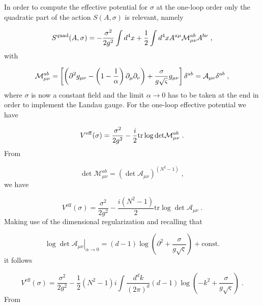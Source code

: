 \documentclass[a4paper,12pt]{article}
\begin{document}
In order to compute the effective potential for $\sigma $ at the one-loop
order only the quadratic part of the action $S(A,\sigma )$ is relevant,
namely

\begin{equation}
S^{\mathrm{quad}}(A,\sigma )=-\frac{\sigma ^{2}}{2g^{2}}\int d^{4}x+\frac{1}{%
2}\int d^{4}xA^{a\mu }\mathcal{M}_{\mu \nu }^{ab}A^{b\nu }\;,  \label{sq}
\end{equation}
with

\begin{equation}
\mathcal{M}_{\mu \nu }^{ab}=\left[ \left( \partial ^{2}g_{\mu \nu }-\left( 1-%
\frac{1}{\alpha }\right) \partial _{\mu }\partial _{\nu }\right) +\frac{%
\sigma }{g\sqrt{\varsigma }}g_{\mu \nu }\right] \delta ^{ab}=\mathcal{A}%
_{\mu \nu }\delta ^{ab}\;,  \label{m}
\end{equation}
where $\sigma $ is now a constant field and the limit $\alpha \rightarrow 0$
has to be taken at the end in order to implement the Landau gauge. For the
one-loop effective potential we have

\begin{equation}
V^{\mathrm{eff}}(\sigma )=\frac{\sigma ^{2}}{2g^{2}}-\frac{i}{2}\mathrm{%
tr\log \det }\mathcal{M}_{\mu \nu }^{ab}\;.  \label{p}
\end{equation}
From

\begin{equation}
\mathrm{\det }\mathcal{M}_{\mu \nu }^{ab}=\left( \mathrm{\det }\mathcal{A}%
_{\mu \nu }\right) ^{\left( N^{2}-1\right) }\;,  \label{ma}
\end{equation}
we have

\begin{equation}
V^{\mathrm{eff}}(\sigma )=\frac{\sigma ^{2}}{2g^{2}}-\frac{i\left(
N^{2}-1\right) }{2}\mathrm{tr\log \det }\mathcal{A}_{\mu \nu }\;.  \label{p1}
\end{equation}
Making use of the dimensional regularization and recalling that

\begin{equation}
\left. \mathrm{\log \det }\mathcal{A}_{\mu \nu }\right| _{\alpha \rightarrow
0}=(d-1)\log \left( \partial ^{2}+\frac{\sigma }{g\sqrt{\varsigma }}\right) +%
\mathrm{const.}  \label{p2}
\end{equation}
it follows

\begin{equation}
V^{\mathrm{eff}}(\sigma )=\frac{\sigma ^{2}}{2g^{2}}-\frac{1}{2}\left(
N^{2}-1\right) i\int \frac{d^{d}k}{\left( 2\pi \right) ^{d}}(d-1)\log \left(
-k^{2}+\frac{\sigma }{g\sqrt{\varsigma }}\right) \;.  \label{p3}
\end{equation}
From
\end{document}
